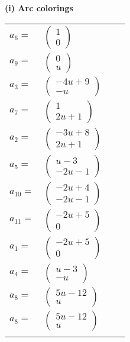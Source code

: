 \documentclass[1p]{elsarticle_modified}
\theoremstyle{definition}
\begin{document}
\flushleft \textbf{(i) Arc colorings}\\
\begin{tabular}{m{7pt} m{180pt} m{7pt} m{180pt} }
\flushright $a_{6}=$&$\begin{pmatrix}1\\0\end{pmatrix}$ \\
\flushright $a_{9}=$&$\begin{pmatrix}0\\u\end{pmatrix}$ \\
\flushright $a_{3}=$&$\begin{pmatrix}-4 u+9\\- u\end{pmatrix}$ \\
\flushright $a_{7}=$&$\begin{pmatrix}1\\2 u+1\end{pmatrix}$ \\
\flushright $a_{2}=$&$\begin{pmatrix}-3 u+8\\2 u+1\end{pmatrix}$ \\
\flushright $a_{5}=$&$\begin{pmatrix}u-3\\-2 u-1\end{pmatrix}$ \\
\flushright $a_{10}=$&$\begin{pmatrix}-2 u+4\\-2 u-1\end{pmatrix}$ \\
\flushright $a_{11}=$&$\begin{pmatrix}-2 u+5\\0\end{pmatrix}$ \\
\flushright $a_{1}=$&$\begin{pmatrix}-2 u+5\\0\end{pmatrix}$ \\
\flushright $a_{4}=$&$\begin{pmatrix}u-3\\- u\end{pmatrix}$ \\
\flushright $a_{8}=$&$\begin{pmatrix}5 u-12\\u\end{pmatrix}$\\ \flushright $a_{8}=$&$\begin{pmatrix}5 u-12\\u\end{pmatrix}$\\&\end{tabular}
\end{document}

